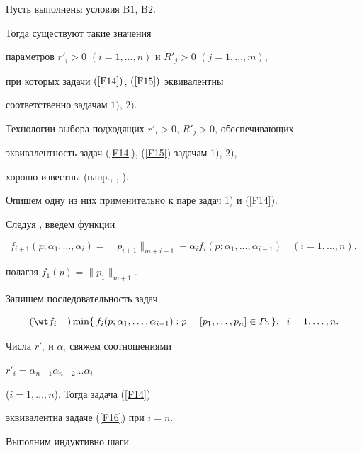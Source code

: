 \begin{thm}


\label{T1}


Пусть выполнены условия $\mathrm B1$, $\mathrm B2$.


Тогда существуют такие значения


параметров $r'_i>0$ $(i=1,\dotsc,n)$ и $R'_j>0$ $(j=1,\dotsc,m)$,


при которых задачи $(\ref{F14})$, $(\ref{F15})$ эквивалентны


соответственно задачам $1)$, $2)$.


\end{thm}





Технологии выбора подходящих $r'_i>0$, $R'_j>0$, обеспечивающих


эквивалентность задач (\ref{F14}), (\ref{F15}) задачам 1), 2),


хорошо известны (напр., \cite{4}, \cite{5}).


Опишем одну из них применительно к паре задач 1) и (\ref{F14}).


Следуя \cite{4}, введем функции


$$


f_{i+1}(p;\alpha_1,\dotsc,\alpha_i)=\| p_{i+1}\|_{m+i+1}+\alpha_i


f_i(p;\alpha_1,\dotsc,\alpha_{i-1})\quad (i=1,\dotsc,n),


$$


полагая $f_1(p)=\| p_1\|_{m+1}$.


Запишем последовательность задач


\begin{equation}


\label{F16}


(\wt f_i=) \min \{\, f_i(p;\alpha_1,\dotsc,\alpha_{i-1}): p=[p_1,


\dotsc, p_n] \in P_0\, \},\ \; i=1,\dotsc,n.


\end{equation}


Числа $r'_i$ и $\alpha_i$ свяжем соотношениями


$r'_i=\alpha_{n-1}\alpha_{n-2}\dotsc \alpha_i$


($i=1,\dotsc,n$). Тогда задача (\ref{F14})


эквивалентна задаче (\ref{F16}) при $i=n$.





Выполним индуктивно шаги





